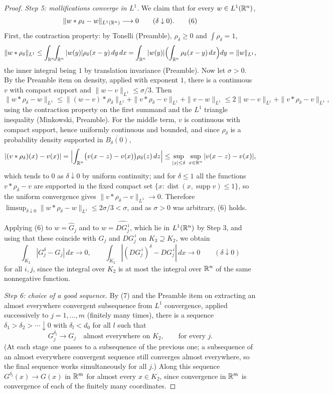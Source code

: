 \begin{proof}
\emph{Step 5: mollifications converge in $L^1$.}  We claim that for every
$w\in L^1(\mathbb{R}^n)$,
\[
\|w*\rho_\delta-w\|_{L^1(\mathbb{R}^n)}\longrightarrow0\qquad(\delta\downarrow0).
\tag{6}
\]
First, the contraction property: by Tonelli (Preamble), $\rho_\delta\ge0$ and
$\int\rho_\delta=1$,
\[
\|w*\rho_\delta\|_{L^1}
\le\int_{\mathbb{R}^n}\!\!\int_{\mathbb{R}^n}|w(y)|\rho_\delta(x-y)\,dy\,dx
=\int_{\mathbb{R}^n}|w(y)|\Bigl(\int_{\mathbb{R}^n}\rho_\delta(x-y)\,dx\Bigr)dy=\|w\|_{L^1},
\]
the inner integral being $1$ by translation invariance (Preamble).  Now let
$\sigma>0$.  By the Preamble item on density, applied with exponent $1$, there
is a continuous $v$ with compact support and $\|w-v\|_{L^1}\le\sigma/3$.  Then
\[
\|w*\rho_\delta-w\|_{L^1}
\le\|(w-v)*\rho_\delta\|_{L^1}+\|v*\rho_\delta-v\|_{L^1}+\|v-w\|_{L^1}
\le2\|w-v\|_{L^1}+\|v*\rho_\delta-v\|_{L^1},
\]
using the contraction property on the first summand and the $L^1$ triangle
inequality (Minkowski, Preamble).  For the middle term, $v$ is continuous with
compact support, hence uniformly continuous and bounded, and since
$\rho_\delta$ is a probability density supported in $\overline{B_\delta(0)}$,
\[
|(v*\rho_\delta)(x)-v(x)|
=\Bigl|\int_{\mathbb{R}^n}\bigl(v(x-z)-v(x)\bigr)\rho_\delta(z)\,dz\Bigr|
\le\sup_{|z|\le\delta}\ \sup_{x\in\mathbb{R}^n}|v(x-z)-v(x)| ,
\]
which tends to $0$ as $\delta\downarrow0$ by uniform continuity; and for
$\delta\le1$ all the functions $v*\rho_\delta-v$ are supported in the fixed
compact set $\{x:\operatorname{dist}(x,\operatorname{supp}v)\le1\}$, so the
uniform convergence gives $\|v*\rho_\delta-v\|_{L^1}\to0$.  Therefore
$\limsup_{\delta\downarrow0}\|w*\rho_\delta-w\|_{L^1}\le2\sigma/3<\sigma$, and
as $\sigma>0$ was arbitrary, (6) holds.

Applying (6) to $w=\widehat G_j$ and to $w=\widehat{DG_j^{\,i}}$, which lie in
$L^1(\mathbb{R}^n)$ by Step 3, and using that these coincide with $G_j$ and
$DG_j^{\,i}$ on $K_3\supseteq K_2$, we obtain
\[
\int_{K_2}|G_j^\delta-G_j|\,dx\longrightarrow0,
\qquad
\int_{K_2}|(DG_j^{\,i})^\delta-DG_j^{\,i}|\,dx\longrightarrow0
\qquad(\delta\downarrow0)
\tag{7}
\]
for all $i,j$, since the integral over $K_2$ is at most the integral over
$\mathbb{R}^n$ of the same nonnegative function.

\emph{Step 6: choice of a good sequence.}  By (7) and the Preamble item on
extracting an almost everywhere convergent subsequence from $L^1$ convergence,
applied successively to $j=1,\dots,m$ (finitely many times), there is a sequence
$\delta_1>\delta_2>\cdots\downarrow0$ with $\delta_l<d_0$ for all $l$ such that
\[
G_j^{\delta_l}\longrightarrow G_j\quad\text{almost everywhere on }K_2,
\qquad\text{for every }j .
\tag{8}
\]
(At each stage one passes to a subsequence of the previous one; a subsequence of
an almost everywhere convergent sequence still converges almost everywhere, so
the final sequence works simultaneously for all $j$.)  Along this sequence
$G^{\delta_l}(x)\to G(x)$ in $\mathbb{R}^m$ for almost every $x\in K_2$, since
convergence in $\mathbb{R}^m$ is convergence of each of the finitely many coordinates.


\end{proof}
